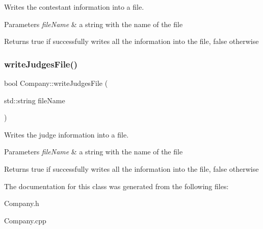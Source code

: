 Writes the contestant information into a file. 


\begin{DoxyParams}{Parameters}
{\em file\+Name} & a string with the name of the file \\
\hline
\end{DoxyParams}
\begin{DoxyReturn}{Returns}
true if successfully writes all the information into the file, false otherwise 
\end{DoxyReturn}
\mbox{\label{class_company_acfdd8f76389ec02d7ab72625ac1bb9d1}} 
\subsubsection{\texorpdfstring{write\+Judges\+File()}{writeJudgesFile()}}
{\footnotesize\ttfamily bool Company\+::write\+Judges\+File (\begin{DoxyParamCaption}\item[{std\+::string}]{file\+Name }\end{DoxyParamCaption})}



Writes the judge information into a file. 


\begin{DoxyParams}{Parameters}
{\em file\+Name} & a string with the name of the file \\
\hline
\end{DoxyParams}
\begin{DoxyReturn}{Returns}
true if successfully writes all the information into the file, false otherwise 
\end{DoxyReturn}


The documentation for this class was generated from the following files\+:\begin{DoxyCompactItemize}
\item 
Company.\+h\item 
Company.\+cpp\end{DoxyCompactItemize}
